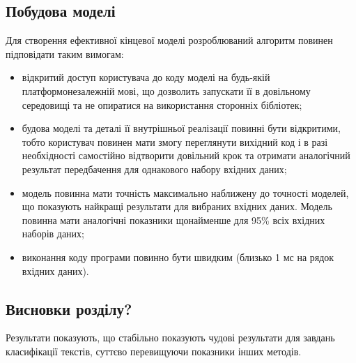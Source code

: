 \subsection{Побудова моделі}
Для створення ефективної кінцевої моделі розроблюваний алгоритм повинен підповідати таким вимогам:
\begin{itemize}  
	\item відкритий доступ користувача до коду моделі на будь-якій платформонезалежній мові, що дозволить запускати її в довільному середовищі та не опиратися на використання сторонніх бібліотек;
	\item будова моделі та деталі її внутрішньої реалізації повинні бути відкритими, тобто користувач повинен мати змогу переглянути вихідний код і в разі необхідності самостійно відтворити довільний крок та отримати аналогічний результат передбачення для однакового набору вхідних даних;
	\item модель повинна мати точність максимально наближену до точності моделей, що показують найкращі результати для вибраних вхідних даних. Модель повинна мати аналогічні показники щонайменше для 95\% всіх вхідних наборів даних;
	\item виконання коду програми повинно бути швидким (близько 1 мс на рядок вхідних даних).
\end{itemize}

\subsection{Висновки розділу?}
Результати показують, що стабільно показують чудові результати для завдань класифікації
текстів, суттєво перевищуючи показники інших методів.